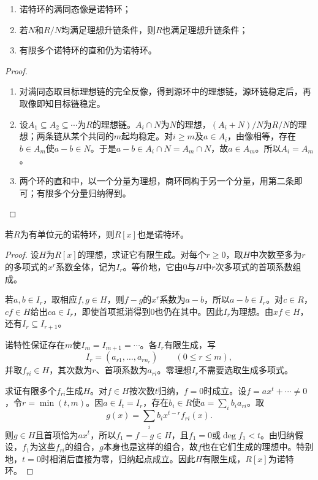 \begin{proposition}
\begin{enumerate}
\item 诺特环的满同态像是诺特环；
\item 若$N$和$R/N$均满足理想升链条件，则$R$也满足理想升链条件；
\item 有限多个诺特环的直和仍为诺特环。
\end{enumerate}
\end{proposition}
\begin{proof}
\begin{enumerate}
\item 对满同态取目标理想链的完全反像，得到源环中的理想链，源环链稳定后，再取像即知目标链稳定。
\item 设$A_1\subseteq A_2\subseteq\cdots$为$R$的理想链。$A_i\cap N$为$N$的理想，$(A_i+N)/N$为$R/N$的理想；两条链从某个共同的$m$起均稳定。对$i\ge m$及$a\in A_i$，由像相等，存在$b\in A_m$使$a-b\in N$。于是$a-b\in A_i\cap N=A_m\cap N$，故$a\in A_m$。所以$A_i=A_m$。
\item 两个环的直和中，以一个分量为理想，商环同构于另一个分量，用第二条即可；有限多个分量归纳得到。
\end{enumerate}
\end{proof}

\begin{theorem}[希尔伯特基定理]\label{p2:hilbert-basis}
若$R$为有单位元的诺特环，则$R[x]$也是诺特环。
\end{theorem}
\begin{proof}
设$H$为$R[x]$的理想，求证它有限生成。对每个$r\ge0$，取$H$中次数至多为$r$的多项式的$x^r$系数全体，记为$I_r$。等价地，它由$0$与$H$中$r$次多项式的首项系数组成。

若$a,b\in I_r$，取相应$f,g\in H$，则$f-g$的$x^r$系数为$a-b$，所以$a-b\in I_r$。对$c\in R$，$cf\in H$给出$ca\in I_r$，即使首项抵消得到$0$也仍在其中。因此$I_r$为理想。由$xf\in H$，还有$I_r\subseteq I_{r+1}$。

诺特性保证存在$m$使$I_m=I_{m+1}=\cdots$。各$I_r$有限生成，写
\[
I_r=(a_{r1},\ldots,a_{rn_r})\qquad(0\le r\le m),
\]
并取$f_{ri}\in H$，其次数为$r$、首项系数为$a_{ri}$。零理想$I_r$不需要选取生成多项式。

求证有限多个$f_{ri}$生成$H$。对$f\in H$按次数$t$归纳，$f=0$时成立。设$f=ax^t+\cdots\ne0$，令$r=\min(t,m)$。因$a\in I_t=I_r$，存在$b_i\in R$使$a=\sum_i b_ia_{ri}$。取
\[
g(x)=\sum_i b_i x^{t-r}f_{ri}(x).
\]
则$g\in H$且首项恰为$ax^t$，所以$f_1=f-g\in H$，且$f_1=0$或$\deg f_1<t$。由归纳假设，$f_1$为这些$f_{ri}$的组合，$g$本身也是这样的组合，故$f$也在它们生成的理想中。特别地，$t=0$时相消后直接为零，归纳起点成立。因此$H$有限生成，$R[x]$为诺特环。
\end{proof}

